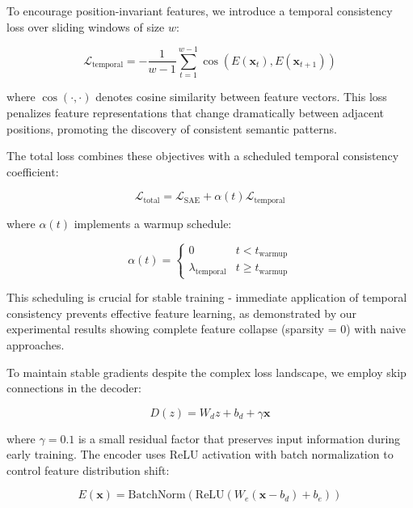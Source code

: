 \documentclass{article} %
\begin{document}
To encourage position-invariant features, we introduce a temporal consistency loss over sliding windows of size $w$:

\begin{equation}
    \mathcal{L}_{\text{temporal}} = -\frac{1}{w-1}\sum_{t=1}^{w-1} \cos(E(\mathbf{x}_t), E(\mathbf{x}_{t+1}))
\end{equation}

where $\cos(\cdot,\cdot)$ denotes cosine similarity between feature vectors. This loss penalizes feature representations that change dramatically between adjacent positions, promoting the discovery of consistent semantic patterns.

The total loss combines these objectives with a scheduled temporal consistency coefficient:

\begin{equation}
    \mathcal{L}_{\text{total}} = \mathcal{L}_{\text{SAE}} + \alpha(t)\mathcal{L}_{\text{temporal}}
\end{equation}

where $\alpha(t)$ implements a warmup schedule:

\begin{equation}
    \alpha(t) = \begin{cases}
        0 & t < t_{\text{warmup}} \\
        \lambda_{\text{temporal}} & t \geq t_{\text{warmup}}
    \end{cases}
\end{equation}

This scheduling is crucial for stable training - immediate application of temporal consistency prevents effective feature learning, as demonstrated by our experimental results showing complete feature collapse (sparsity = 0) with naive approaches.

To maintain stable gradients despite the complex loss landscape, we employ skip connections in the decoder:

\begin{equation}
    D(z) = W_d z + b_d + \gamma \mathbf{x}
\end{equation}

where $\gamma=0.1$ is a small residual factor that preserves input information during early training. The encoder uses ReLU activation with batch normalization to control feature distribution shift:

\begin{equation}
    E(\mathbf{x}) = \text{BatchNorm}(\text{ReLU}(W_e(\mathbf{x} - b_d) + b_e))
\end{equation}
\end{document}
